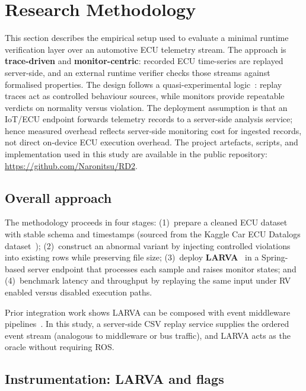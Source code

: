 \section{Research Methodology}
\label{sec:Res}

This section describes the empirical setup used to evaluate a minimal runtime verification layer over an automotive ECU telemetry stream. The approach is \textbf{trace-driven} and \textbf{monitor-centric}: recorded ECU time-series are replayed server-side, and an external runtime verifier checks those streams against formalised properties. The design follows a quasi-experimental logic~\cite{saunders2016research}: replay traces act as controlled behaviour sources, while monitors provide repeatable verdicts on normality versus violation. The deployment assumption is that an IoT/ECU endpoint forwards telemetry records to a server-side analysis service; hence measured overhead reflects server-side monitoring cost for ingested records, not direct on-device ECU execution overhead. The project artefacts, scripts, and implementation used in this study are available in the public repository: \url{https://github.com/Naronitsu/RD2}.

\subsection{Overall approach}

The methodology proceeds in four stages: (1)~prepare a cleaned ECU dataset with stable schema and timestamps (sourced from the Kaggle Car ECU Datalogs dataset~\cite{gxkok21ecudatalogs}); (2)~construct an abnormal variant by injecting controlled violations into existing rows while preserving file size; (3)~deploy \textbf{LARVA}~\cite{colombo2009larva} in a Spring-based server endpoint that processes each sample and raises monitor states; and (4)~benchmark latency and throughput by replaying the same input under RV enabled versus disabled execution paths.

Prior integration work shows LARVA can be composed with event middleware pipelines~\cite{abela2023rvtee}. In this study, a server-side CSV replay service supplies the ordered event stream (analogous to middleware or bus traffic), and LARVA acts as the oracle without requiring ROS.

\subsection{Instrumentation: LARVA and flags}

